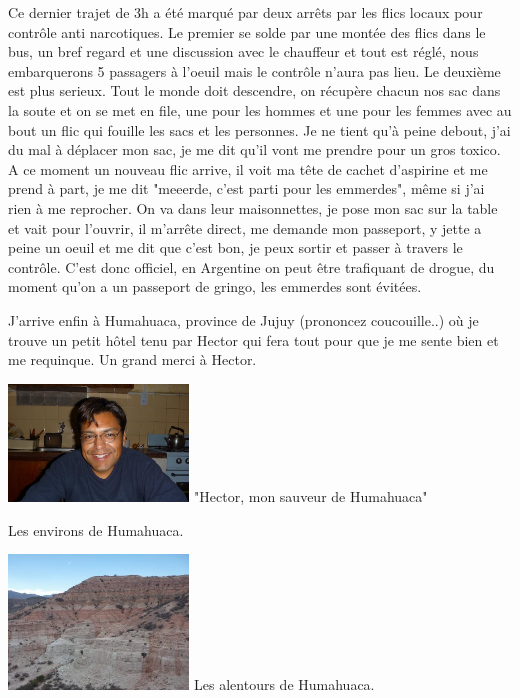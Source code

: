 \begin{multicols}{2}
Ce dernier trajet de 3h a été marqué par deux arrêts par les flics locaux pour contrôle anti narcotiques. Le premier se solde par une montée des flics dans le bus, un bref regard et une discussion avec le chauffeur et tout est réglé, nous embarquerons 5 passagers à l'oeuil mais le contrôle n'aura pas lieu. Le deuxième est plus serieux. Tout le monde doit descendre, on récupère chacun nos sac dans la soute et on se met en file, une pour les hommes et une pour les femmes avec au bout un flic qui fouille les sacs et les personnes. Je ne tient qu'à peine debout, j'ai du mal à déplacer mon sac, je me dit qu'il vont me prendre pour un gros toxico. A ce moment un nouveau flic arrive, il voit ma tête de cachet d'aspirine et me prend à part, je me dit "meeerde, c'est parti pour les emmerdes", même si j'ai rien à me reprocher. On va dans leur maisonnettes, je pose mon sac sur la table et vait pour l'ouvrir, il m'arrête direct, me demande mon passeport, y jette a peine un oeuil et me dit que c'est bon, je peux sortir et passer à travers le contrôle. C'est donc officiel, en Argentine on peut être trafiquant de drogue, du moment qu'on a un passeport de gringo, les emmerdes sont évitées.

J'arrive enfin à Humahuaca, province de Jujuy (prononcez coucouille..) où je trouve un petit hôtel tenu par Hector qui fera tout pour que je me sente bien et me requinque. Un grand merci à Hector.

\hspace*{-0.65cm}
\includegraphics[width=4.8cm]{articles/La-paz-humahuaca-et-salaar/1257388208hISG.jpg}
"Hector, mon sauveur de Humahuaca"

Les environs de Humahuaca.

\hspace*{-0.65cm}
\includegraphics[width=4.8cm]{articles/La-paz-humahuaca-et-salaar/125738819811hb.jpg}
Les alentours de Humahuaca.


\end{multicols}
